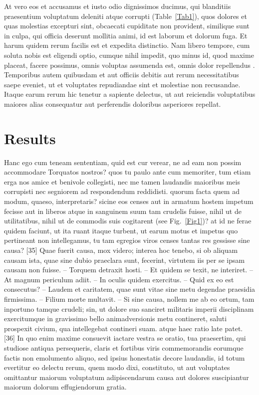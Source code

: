 \documentclass[a4paper,12pt]{article}
\begin{document}
At vero eos et accusamus et iusto odio dignissimos ducimus, qui blanditiis praesentium
voluptatum deleniti atque corrupti (Table~\ref{Tab1}), quos dolores et quas molestias
excepturi sint, obcaecati cupiditate non provident, similique sunt in culpa, qui officia
deserunt mollitia animi, id est laborum et dolorum fuga. Et harum quidem rerum facilis est
et expedita distinctio. Nam libero tempore, cum soluta nobis est eligendi optio, cumque
nihil impedit, quo minus id, quod maxime placeat, facere possimus, omnis voluptas
assumenda est, omnis dolor repellendus \citep{Gibeau_1998}. Temporibus autem quibusdam et
aut officiis debitis aut rerum necessitatibus saepe eveniet, ut et voluptates repudiandae
sint et molestiae non recusandae. Itaque earum rerum hic tenetur a sapiente delectus, ut
aut reiciendis voluptatibus maiores alias consequatur aut perferendis doloribus asperiores
repellat.

\section*{Results}

Hanc ego cum teneam sententiam, quid est cur verear, ne ad eam non possim accommodare
Torquatos nostros? quos tu paulo ante cum memoriter, tum etiam erga nos amice et benivole
collegisti, nec me tamen laudandis maioribus meis corrupisti nec segniorem ad respondendum
reddidisti. quorum facta quem ad modum, quaeso, interpretaris? sicine eos censes aut in
armatum hostem impetum fecisse aut in liberos atque in sanguinem suum tam crudelis fuisse,
nihil ut de utilitatibus, nihil ut de commodis suis cogitarent (see Fig.~\ref{Fig1})?
at id ne ferae quidem faciunt, ut ita ruant itaque turbent, ut earum motus et impetus quo
pertineant non intellegamus, tu tam egregios viros censes tantas res gessisse sine causa?
[35] Quae fuerit causa, mox videro; interea hoc tenebo, si ob aliquam causam ista, quae
sine dubio praeclara sunt, fecerint, virtutem iis per se ipsam causam non fuisse. --
Torquem detraxit hosti. -- Et quidem se texit, ne interiret. -- At magnum periculum
adiit. -- In oculis quidem exercitus. -- Quid ex eo est consecutus? -- Laudem et
caritatem, quae sunt vitae sine metu degendae praesidia firmissima. -- Filium morte
multavit. -- Si sine causa, nollem me ab eo ortum, tam inportuno tamque crudeli; sin, ut
dolore suo sanciret militaris imperii disciplinam exercitumque in gravissimo bello
animadversionis metu contineret, saluti prospexit civium, qua intellegebat contineri
suam. atque haec ratio late patet. [36] In quo enim maxime consuevit iactare vestra se
oratio, tua praesertim, qui studiose antiqua persequeris, claris et fortibus viris
commemorandis eorumque factis non emolumento aliquo, sed ipsius honestatis decore
laudandis, id totum evertitur eo delectu rerum, quem modo dixi, constituto, ut aut
voluptates omittantur maiorum voluptatum adipiscendarum causa aut dolores suscipiantur
maiorum dolorum effugiendorum gratia.
\end{document}

